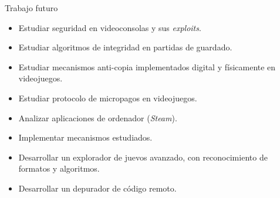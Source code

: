 \begin{frame}{Trabajo futuro}
\begin{itemize}
    \item<+-> Estudiar seguridad en videoconsolas y sus \textit{exploits}.

    \item<+-> Estudiar algoritmos de integridad en partidas de guardado.

    \item<+-> Estudiar mecanismos anti-copia implementados digital y físicamente en videojuegos.

    \item<+-> Estudiar protocolo de micropagos en videojuegos.

    \item<+-> Analizar aplicaciones de ordenador (\textit{Steam}).

    \item<+-> Implementar mecanismos estudiados.

    \item<+-> Desarrollar un explorador de juevos avanzado, con reconocimiento de formatos y algoritmos.

    \item<+-> Desarrollar un depurador de código remoto.
\end{itemize}
\end{frame}
